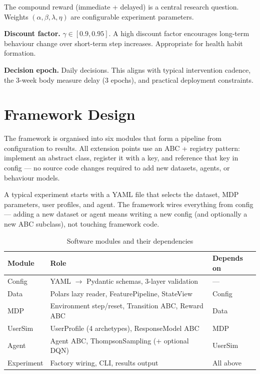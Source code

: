 \documentclass[11pt,a4paper]{article}
\begin{document}
The compound reward (immediate + delayed) is a central research question.
Weights $(\alpha, \beta, \lambda, \eta)$ are configurable experiment parameters.

\textbf{Discount factor.} $\gamma \in [0.9, 0.95]$. A high discount factor
encourages long-term behaviour change over short-term step increases.
Appropriate for health habit formation.

\textbf{Decision epoch.} Daily decisions. This aligns with typical intervention cadence,
the 3-week body measure delay (3 epochs), and practical deployment
constraints.

\section{Framework Design}
\label{sec:design}

The framework is organised into six modules that form a pipeline from
configuration to results. All extension points use an ABC + registry pattern:
implement an abstract class, register it with a key, and reference that key in
config --- no source code changes required to add new datasets, agents, or
behaviour models.

A typical experiment starts with a YAML file that selects the dataset,
MDP parameters, user profiles, and agent. The framework wires everything
from config --- adding a new dataset or agent means writing a new config
(and optionally a new ABC subclass), not touching framework code.

\begin{table}[H]
\centering
\caption{Software modules and their dependencies}
\begin{tabular}{lll}
\toprule
Module & Role & Depends on \\
\midrule
Config & YAML $\rightarrow$ Pydantic schemas, 3-layer validation & --- \\
Data & Polars lazy reader, FeaturePipeline, StateView & Config \\
MDP & Environment step/reset, Transition ABC, Reward ABC & Data \\
UserSim & UserProfile (4 archetypes), ResponseModel ABC & MDP \\
Agent & Agent ABC, ThompsonSampling (+ optional DQN) & UserSim \\
Experiment & Factory wiring, CLI, results output & All above \\
\bottomrule
\end{tabular}
\end{table}
\end{document}
